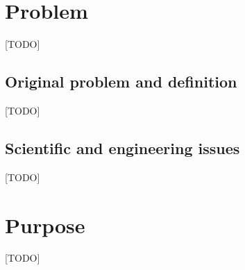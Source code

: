 \section{Problem}

[TODO]

\subsection{Original problem and definition}
[TODO]

\subsection{Scientific and engineering issues}
[TODO]

\section{Purpose}

[TODO]

